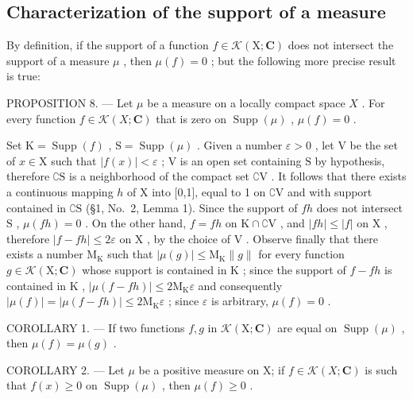 \subsection{Characterization of the support of a measure}

By definition, if the support of a function \(f \in \mathcal{K}(\mathrm{X};\mathbf{C})\) does not intersect the support of a measure \(\mu\) , then \(\mu(f) = 0\) ; but the following more precise result is true:

PROPOSITION 8. --- Let \(\mu\) be a measure on a locally compact space \(X\) . For every function \(f \in \mathcal{K}(X; \mathbf{C})\) that is zero on \(\operatorname{Supp}(\mu)\) , \(\mu(f) = 0\) .

Set \(\mathrm{K} = \operatorname{Supp}(f)\) , \(\mathrm{S} = \operatorname{Supp}(\mu)\) . Given a number \(\varepsilon > 0\) , let \(\mathrm{V}\) be the set of \(x \in \mathrm{X}\) such that \(|f(x)| < \varepsilon\) ; \(\mathrm{V}\) is an open set containing \(\mathrm{S}\) by hypothesis, therefore \(\complement \mathrm{S}\) is a neighborhood of the compact set \(\complement \mathrm{V}\) . It follows that there exists a continuous mapping \(h\) of \(\mathrm{X}\) into {[}0,1{]}, equal to 1 on \(\complement \mathrm{V}\) and with support contained in \(\complement \mathrm{S}\) (§1, No.~2, Lemma 1). Since the support of \(fh\) does not intersect \(\mathrm{S}\) , \(\mu(fh) = 0\) . On the other hand, \(f = fh\) on \(\mathrm{K} \cap \complement \mathrm{V}\) , and \(|fh| \leqslant |f|\) on \(\mathrm{X}\) , therefore \(|f - fh| \leqslant 2\varepsilon\) on \(\mathrm{X}\) , by the choice of \(\mathrm{V}\) . Observe finally that there exists a number \(\mathrm{M}_{\mathrm{K}}\) such that \(|\mu(g)| \leqslant \mathrm{M}_{\mathrm{K}} \| g\|\) for every function \(g \in \mathcal{K}(\mathrm{X};\mathbf{C})\) whose support is contained in \(\mathrm{K}\) ; since the support of \(f - fh\) is contained in \(\mathrm{K}\) , \(|\mu(f - fh)| \leqslant 2\mathrm{M}_{\mathrm{K}}\varepsilon\) and consequently \(|\mu(f)| = |\mu(f - fh)| \leqslant 2\mathrm{M}_{\mathrm{K}}\varepsilon\) ; since \(\varepsilon\) is arbitrary, \(\mu(f) = 0\) .

COROLLARY 1. --- If two functions \(f, g\) in \(\mathcal{K}(\mathrm{X};\mathbf{C})\) are equal on \(\operatorname{Supp}(\mu)\) , then \(\mu(f) = \mu(g)\) .

COROLLARY 2. --- Let \(\mu\) be a positive measure on X; if \(f \in \mathcal{K}(X; \mathbf{C})\) is such that \(f(x) \geqslant 0\) on \(\operatorname{Supp}(\mu)\) , then \(\mu(f) \geqslant 0\) .

